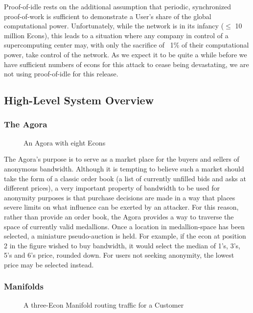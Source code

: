 \documentclass{article}
\begin{document}
Proof-of-idle rests on the additional assumption that periodic, synchronized proof-of-work is sufficient to demonstrate a User’s share of the global computational power. Unfortunately, while the network is in its infancy ($\leq$ 10 million Econs), this leads to a situation where any company in control of a supercomputing center may, with only the sacrifice of ~1\% of their computational power, take control of the network. As we expect it to be quite a while before we have sufficient numbers of econs for this attack to cease being devastating, we are not using proof-of-idle for this release.

\subsection{High-Level System Overview}

\subsubsection{The Agora}

\begin{figure}[htbp]
  \centering
  
  \caption{An Agora with eight Econs}
\end{figure}

The Agora’s purpose is to serve as a market place for the buyers and sellers of anonymous bandwidth. Although it is tempting to believe such a market should take the form of a classic order book (a list of currently unfilled bids and asks at different prices), a very important property of bandwidth to be used for anonymity purposes is that purchase decisions are made in a way that places severe limits on what influence can be exerted by an attacker. For this reason, rather than provide an order book, the Agora provides a way to traverse the space of currently valid medallions. Once a location in medallion-space has been selected, a miniature pseudo-auction is held. For example, if the econ at position 2 in the figure wished to buy bandwidth, it would select the median of 1’s, 3’s, 5’s and 6’s price, rounded down. For users not seeking anonymity, the lowest price may be selected instead.


\subsubsection{Manifolds}

\begin{figure}[htbp]
  \centering
  
  \caption{A three-Econ Manifold routing traffic for a Customer}
\end{figure}
\end{document}
